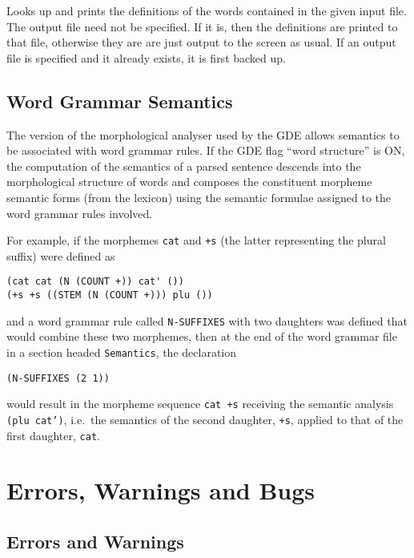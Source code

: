 Looks up and prints the definitions of the words contained in the
given input file.  The output file need not be specified. If it is,
then the definitions are printed to that file, otherwise they are
are just output to the screen as usual. If an output file is specified
and it already exists, it is first backed up.

\section{Word Grammar Semantics}

The version of the morphological analyser used by the GDE allows semantics
to be associated with word grammar rules. If the GDE flag ``word structure''
is ON, the computation of the semantics of a parsed sentence descends
into the morphological structure of words and composes the constituent
morpheme semantic forms (from the lexicon) using the semantic formulae
assigned to the word grammar rules involved.

For example, if the morphemes {\tt cat} and {\tt +s} (the latter representing
the plural suffix) were defined as
\begin{ex}
\begin{verbatim}
(cat cat (N (COUNT +)) cat' ())
(+s +s ((STEM (N (COUNT +))) plu ())
\end{verbatim}
\end{ex}
and a word grammar rule called {\tt N-SUFFIXES} with two daughters was
defined that would combine these two morphemes, then at the end of the
word grammar file in a section headed {\tt Semantics}, the declaration
\begin{ex}
\begin{verbatim}
(N-SUFFIXES (2 1))
\end{verbatim}
\end{ex}
would result in the morpheme sequence {\tt cat +s} receiving the semantic
analysis {\tt (plu cat')}, i.e.\ the semantics of the second daughter,
{\tt +s}, applied to that of the first daughter, {\tt cat}.


\chapter{Errors, Warnings and Bugs}

\section{Errors and Warnings}

